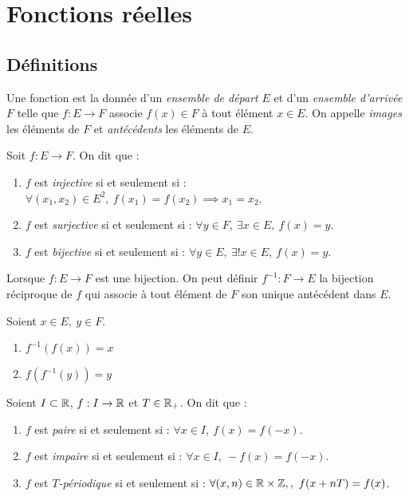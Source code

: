 \chapter{Fonctions réelles}

\section{Définitions}
\begin{definition}[Fonction]
	Une fonction est la donnée d'un \emph{ensemble de départ} $E$ et d'un \emph{ensemble d'arrivée} $F$ telle que 
	$ f : E \to F $
	associe $f(x) \in F$ à tout élément $x \in E$.
	On appelle \emph{images} les éléments de $F$ et \emph{antécédents} les éléments de $E$.
\end{definition}

\begin{definition}
	Soit $f : E \to F$. On dit que :
    \begin{enumerate}
        \item $f$ est \emph{injective} si et seulement si : $\forall (x_1, x_2) \in E^2,\ f(x_1) = f(x_2) \implies x_1 = x_2$.
        \item $f$ est \emph{surjective} si et seulement si : $\forall y \in F,\ \exists x \in E,\ f(x) = y$.
        \item $f$ est \emph{bijective} si et seulement si : $\forall y \in E,\ \exists ! x \in E,\ f(x) = y$.
    \end{enumerate}
\end{definition}

\begin{definition}
	Lorsque $f : E \to F$ est une bijection. On peut définir $f^{-1} : F \to E$ la bijection réciproque de $f$ qui associe à tout élément de $F$ son unique antécédent dans $E$.
\end{definition}

\begin{proposition}
	Soient $x \in E,\ y \in F$.
    \begin{multicols}{2}
        \begin{enumerate}
            \item $f^{-1} (f(x)) = x$
            \item $f(f^{-1}(y)) = y$
        \end{enumerate}
    \end{multicols}
\end{proposition}

\begin{definition}
	Soient $I \subset \mathbb{R}$, $f : I \to \mathbb{R}$ et $T \in \mathbb{R}_+$. On dit que :
    \begin{enumerate}
        \item $f$ est \emph{paire} si et seulement si : $\forall x \in I,\ f(x) = f(-x)$.
        \item $f$ est \emph{impaire} si et seulement si : $\forall x \in I,\ -f(x) = f(-x)$.
        \item $f$ est \emph{$T$-périodique} si et seulement si : $\forall (x,n) \in \mathbb{R} \times \mathbb{Z},,\ f(x + nT) = f(x)$.
    \end{enumerate}
\end{definition}

